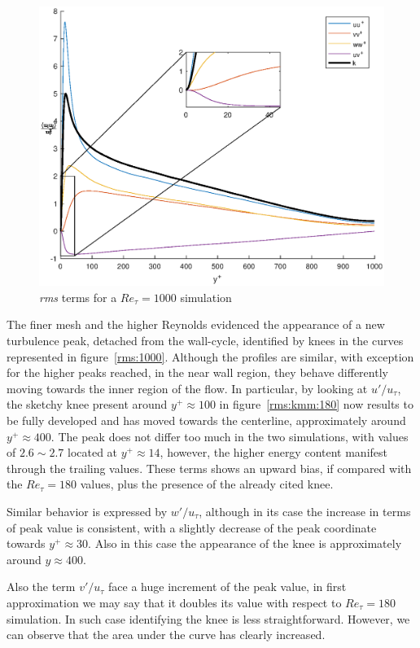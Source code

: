 \begin{figure}
\begin{center}
\includegraphics[scale=0.55]{grafici/budget+k_1000.eps}
\caption{\emph{rms} terms for a $Re_{\tau}=1000$ simulation}
\label{budget:1000}
\end{center} 
\end{figure}


The finer mesh and the higher Reynolds evidenced the appearance of a new turbulence peak, detached from the wall-cycle, identified by knees in the curves represented in figure~\ref{rms:1000}. Although the profiles are similar, with exception for the higher peaks reached, in the near wall region, they behave differently moving towards the inner region of the flow. In particular, by looking at $u'/u_{\tau}$, the sketchy knee present around $y^{+}\approx 100$ in figure~\ref{rms:kmm:180} now results to be fully developed and has moved towards the centerline, approximately around $y^{+}\approx 400$. The peak does not differ too much in the two simulations, with values of $2.6\sim2.7$ located at $y^{+}\approx14$, however, the higher energy content manifest through the trailing values. These terms shows an upward bias, if compared with the $Re_{\tau}=180$ values, plus the presence of the already cited knee.\par
Similar behavior is expressed by $w'/u_{\tau}$, although in its case the increase in terms of peak value is consistent, with a slightly decrease of the peak coordinate towards $y^{+}\approx30$. Also in this case the appearance of the knee is approximately around $y\approx 400$.\par
Also the term $v'/u_{\tau}$ face a huge increment of the peak value, in first approximation we may say that it doubles its value with respect to $Re_{\tau}=180$ simulation. In such case identifying the knee is less straightforward. However, we can observe that the area under the curve has clearly increased.\\~\par

